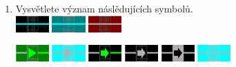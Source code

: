 \documentclass[12pt,a4paper]{article}
\begin{document}
\begin{enumerate}[leftmargin=*]
\item Vysvětlete význam náslědujících symbolů. \\
\includegraphics[width=0.1\textwidth]{symboly/kol5.png}
\includegraphics[width=0.1\textwidth]{symboly/kol7.png}
\includegraphics[width=0.1\textwidth]{symboly/kol8.png}

\includegraphics[width=0.1\textwidth]{symboly/hlnav9.png}
\includegraphics[width=0.1\textwidth]{symboly/hlnav15.png}
\includegraphics[width=0.1\textwidth]{symboly/hlnav17.png}
\includegraphics[width=0.1\textwidth]{symboly/hlnav18.png}
\includegraphics[width=0.1\textwidth]{symboly/hlnav19.png}
\includegraphics[width=0.1\textwidth]{symboly/senav14.png}


\end{enumerate}
\end{document}
